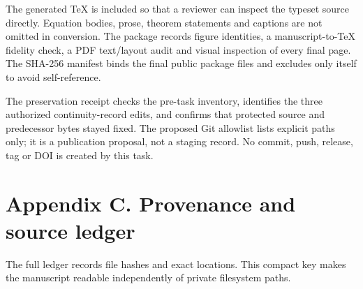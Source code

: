 \documentclass[
  11pt,
  a4paper,
]{article}
\begin{document}
The generated TeX is included so that a reviewer can inspect the typeset source directly. Equation bodies, prose, theorem statements and captions are not omitted in conversion. The package records figure identities, a manuscript-to-TeX fidelity check, a PDF text/layout audit and visual inspection of every final page. The SHA-256 manifest binds the final public package files and excludes only itself to avoid self-reference.

The preservation receipt checks the pre-task inventory, identifies the three authorized continuity-record edits, and confirms that protected source and predecessor bytes stayed fixed. The proposed Git allowlist lists explicit paths only; it is a publication proposal, not a staging record. No commit, push, release, tag or DOI is created by this task.

\section{Appendix C. Provenance and source ledger}\label{appendix-c.-provenance-and-source-ledger}

The full ledger records file hashes and exact locations. This compact key makes the manuscript readable independently of private filesystem paths.
\end{document}
